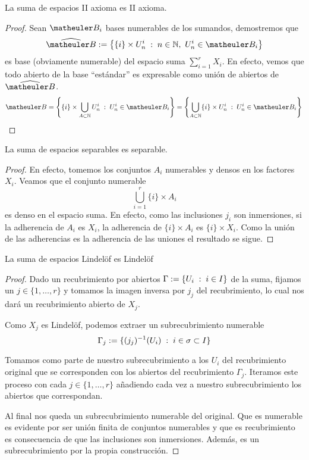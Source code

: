 \begin{lem}
	La suma de espacios II axioma es II axioma.
\end{lem}
\begin{proof}
	Sean $\B_i$ bases numerables de los sumandos, demostremos que
	\[\widehat{\B}:=\left\{\{i\}\times U_n^i\midc n\in\N,\ U_n^i\in\B_i\right\}\]
	es base (obviamente numerable) del espacio suma $\sum_{i=1}^rX_i$. En efecto, vemos que todo abierto de la base ``estándar'' es expresable como unión de abiertos de $\widehat{\B}$. 
	\begin{equation*}
		\B=\left\{\{i\}\times\bigcup_{A\subset \N}U_n^i\midc U_n^i\in\B_i\right\}=\left\{\bigcup_{A\subset\N}\{i\}\times U_n^i\midc U_n^i\in\B_i\right\}\qedhere
	\end{equation*}
\end{proof}

\begin{lem}
	La suma de espacios separables es separable.
\end{lem}
\begin{proof}
	En efecto, tomemos los conjuntos $A_i$ numerables y densos en los factores $X_i$. Veamos que el conjunto numerable
	\begin{equation*}
		\bigcup_{i=1}^r\{i\}\times A_i
	\end{equation*}
	es denso en el espacio suma. En efecto, como las inclusiones $j_i$ son inmersiones, si la adherencia de $A_i$ es $X_i$, la adherencia de $\{i\}\times A_i$ es $\{i\}\times X_i$. Como la unión de las adherencias es la adherencia de las uniones el resultado se sigue. 
\end{proof}

\begin{lem}
	La suma de espacios Lindelöf es Lindelöf
\end{lem}
\begin{proof}
	Dado un recubrimiento por abiertos $\Gamma:=\{U_i\;:\; i\in I\}$ de la suma, fijamos un $j\in\{1,\dots,r\}$ y tomamos la imagen inversa por $j_j$ del recubrimiento, lo cual nos dará un recubrimiento abierto de $X_j$.
	
	Como $X_j$ es Lindelöf, podemos extraer un subrecubrimiento numerable \[\Gamma_j:=\{(j_j)^{-1}(U_i)\;:\; i\in\sigma\subset I\}\]
	
	Tomamos como parte de nuestro subrecubrimiento a los $U_i$ del recubrimiento original que se corresponden con los abiertos del recubrimiento $\Gamma_j$. Iteramos este proceso con cada $j\in\{1,\dots,r\}$ añadiendo cada vez a nuestro subrecubrimiento los abiertos que correspondan.
	
	Al final nos queda un subrecubrimiento numerable del original. Que es numerable es evidente por ser unión finita de conjuntos numerables y que es recubrimiento es consecuencia de que las inclusiones son inmersiones. Además, es un subrecubrimiento por la propia construcción.
\end{proof}
